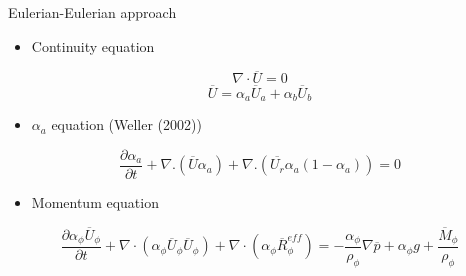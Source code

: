 \documentclass{beamer}
\begin{document}
\begin{frame}{Eulerian-Eulerian approach}
{\begin{itemize}
\item Continuity equation
\end{itemize}
\begin{equation}
\nabla\cdot\overline{U} =0
\end{equation}
\begin{equation}
\overline{U} =\alpha_a\overline{U}_a+\alpha_b\overline{U}_b
\end{equation}
\begin{itemize}
\item $\alpha_a$ equation (Weller (2002))
\end{itemize}
\begin{equation}
\frac{\partial\alpha_{a}}{\partial t}+ \nabla. (\overline{U}\alpha_{a})+\nabla. (\overline{U_r}\alpha_{a}(1-\alpha_{a}))=0
\end{equation}
\begin{itemize}
\item Momentum equation
\end{itemize}
\begin{equation}
\frac{\partial\alpha_\phi\overline{U}_\phi}{\partial t}+\nabla\cdot(\alpha_\phi\overline{U}_\phi\overline{U}_\phi)+\nabla\cdot (\alpha_\phi\overline{R}_\phi^{eff}) = -\frac{\alpha_\phi}{\rho_\phi}\nabla\overline{p}+\alpha_\phi g+\frac{\overline{M}_\phi}{\rho_\phi}
\label{eqn:eqn2.5}
\end{equation}
}


\end{frame}
\end{document}
